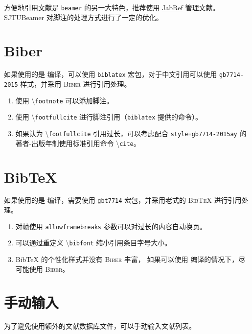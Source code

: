\documentclass[
    UTF8,
    heading=true,
    12pt,
    a4paper
]{ctexrep}
\newenvironment{commentlist}
{\begin{enumerate}\small}
{\end{enumerate}}
\newcommand{\cmd}[1]{\textbackslash{}\texttt{#1}}
\newcommand{\cls}[1]{\texttt{#1}}
\newcommand{\pkg}[1]{\texttt{#1}}
\newcommand{\opt}[1]{\texttt{#1}}
\def\themename{\textsf{SJTUBeamer}}
\begin{document}
方便地引用文献是 \cls{beamer} 的另一大特色，推荐使用
\href{https://www.jabref.org/}{JabRef}
管理文献。\themename{} 对脚注的处理方式进行了一定的优化。

\section{Biber}

\faApple{} \faLinux{} 如果使用的是 
编译，可以使用 \pkg{biblatex} 宏包，对于中文引用可以使用
\opt{gb7714-2015} 样式，并采用 \textsc{Biber} 进行引用处理。


\begin{commentlist}
  \item 使用 \cmd{footnote} 可以添加脚注。
  \item 使用 \cmd{footfullcite}
  进行脚注引用（\pkg{biblatex} 提供的命令）。
  \item 如果认为 \cmd{footfullcite} 引用过长，可以考虑配合
  \opt{style=gb7714-2015ay} 的著者-出版年制使用标准引用命令
  \cmd{cite}。
\end{commentlist}

\section{Bib\TeX{}}

\faWindows 如果使用的是  编译，需要使用
\pkg{gbt7714} 宏包，并采用老式的 \textsc{Bib\TeX{}}
进行引用处理。


\begin{commentlist}
  \item 对帧使用 \verb"allowframebreaks"
  参数可以对过长的内容自动换页。
  \item 可以通过重定义 \cmd{bibfont} 缩小引用条目字号大小。
  \item Bib\TeX{} 的个性化样式并没有 \textsc{Biber} 丰富， 如果可以使用  编译的情况下，尽可能使用
  \textsc{Biber}。
\end{commentlist}

\section{手动输入}

为了避免使用额外的文献数据库文件，可以手动输入文献列表。

\end{document}
